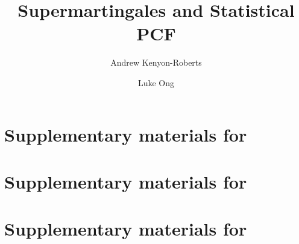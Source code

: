 \documentclass[conference]{IEEEtran}
\begin{document}
\title{Supermartingales and Statistical PCF}

\author{Andrew Kenyon-Roberts
\and Luke Ong}

\maketitle

\begin{abstract}
\end{abstract}

\IEEEpeerreviewmaketitle











%





\appendix

\section{Supplementary materials for }



\section{Supplementary materials for }

\section{Supplementary materials for }

\tableofcontents



\end{document}
